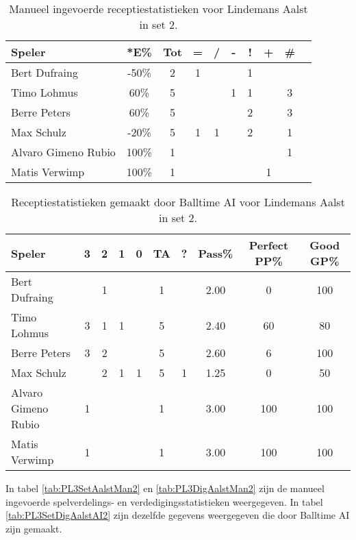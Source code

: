 \begin{table}[ht!]
    \centering
    \scriptsize
    \begin{tabular}{|l|c|c|c|c|c|c|c|c|c|}
        \hline
        \textbf{Speler} & *E\% & Tot & = & / & - & ! & + & \# \\ \hline
        Bert Dufraing & -50\% & 2 & 1 &  & & 1 &  &  \\ 
        Timo Lohmus & 60\% & 5 &  &  & 1 & 1 & & 3 \\ 
        Berre Peters & 60\% & 5 &  &  &  & 2 & & 3 \\ 
        Max Schulz & -20\% & 5 & 1 & 1 & & 2 &  & 1 \\
        Alvaro Gimeno Rubio & 100\% & 1 &  &  &  & &  & 1 \\ 
        Matis Verwimp & 100\% & 1 & & & & & 1 &  \\ \hline
    \end{tabular}
  \caption[Manueel ingevoerde receptiestatistieken voor Lindemans Aalst in set 2]{\label{tab:PL3ReceiveAalstMan2}Manueel ingevoerde receptiestatistieken voor Lindemans Aalst in set 2.}
\end{table}

\begin{table}[ht!]
  \centering
  \scriptsize
  \begin{tabular}{|l|c|c|c|c|c|c|c|c|c|} \hline
    \textbf{Speler} & 3 & 2 & 1 & 0 & TA & ? & Pass\% & Perfect PP\% & Good GP\% \\ \hline
    Bert Dufraing &  &  1 &  &  & 1 &  & 2.00 & 0 & 100 \\
    Timo Lohmus & 3 & 1 & 1 &   & 5 &  & 2.40 & 60 & 80 \\
    Berre Peters & 3 & 2 &   &  & 5 &  & 2.60 & 6 & 100 \\
    Max Schulz &   & 2 & 1 & 1 & 5 & 1 & 1.25 & 0 & 50  \\
    Alvaro Gimeno Rubio & 1 &   &   &  & 1 &  & 3.00 & 100 & 100 \\
    Matis Verwimp & 1 &   &   &  & 1 &  & 3.00 & 100 & 100 \\ \hline
  \end{tabular}
  \caption[Receptiestatistieken gemaakt door Balltime AI voor Lindemans Aalst in set 2]{\label{tab:PL3ReceiveAalstAI2}Receptiestatistieken gemaakt door Balltime AI voor Lindemans Aalst in set 2.}
\end{table}

In tabel \ref{tab:PL3SetAalstMan2} en \ref{tab:PL3DigAalstMan2} zijn de manueel ingevoerde spelverdelings- en verdedigingsstatistieken weergegeven. In tabel \ref{tab:PL3SetDigAalstAI2} zijn dezelfde gegevens weergegeven die door Balltime AI zijn gemaakt.

